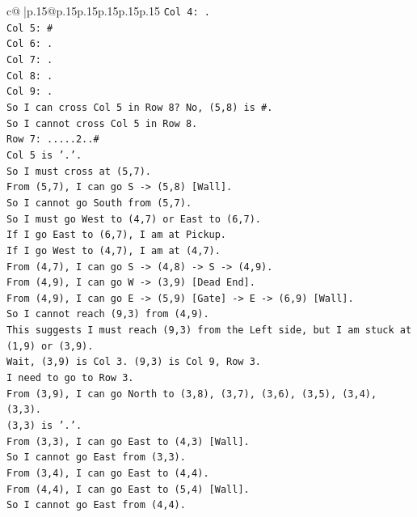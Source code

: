 \documentclass{article}
\begin{document}
{\begin{supertabular}{c@{$\;$}|p{.15\linewidth}@{}p{.15\linewidth}p{.15\linewidth}p{.15\linewidth}p{.15\linewidth}p{.15\linewidth}}
{{{\texttt{Col 4: .} \\
\texttt{Col 5: \#} \\
\texttt{Col 6: .} \\
\texttt{Col 7: .} \\
\texttt{Col 8: .} \\
\texttt{Col 9: .} \\
\texttt{So I can cross Col 5 in Row 8? No, (5,8) is \#.} \\
\texttt{So I cannot cross Col 5 in Row 8.} \\
\texttt{Row 7: .....2..\#} \\
\texttt{Col 5 is '.'.} \\
\texttt{So I must cross at (5,7).} \\
\texttt{From (5,7), I can go S {-}> (5,8) {[}Wall{]}.} \\
\texttt{So I cannot go South from (5,7).} \\
\texttt{So I must go West to (4,7) or East to (6,7).} \\
\texttt{If I go East to (6,7), I am at Pickup.} \\
\texttt{If I go West to (4,7), I am at (4,7).} \\
\texttt{From (4,7), I can go S {-}> (4,8) {-}> S {-}> (4,9).} \\
\texttt{From (4,9), I can go W {-}> (3,9) {[}Dead End{]}.} \\
\texttt{From (4,9), I can go E {-}> (5,9) {[}Gate{]} {-}> E {-}> (6,9) {[}Wall{]}.} \\
\texttt{So I cannot reach (9,3) from (4,9).} \\
\texttt{This suggests I must reach (9,3) from the Left side, but I am stuck at (1,9) or (3,9).} \\
\texttt{Wait, (3,9) is Col 3. (9,3) is Col 9, Row 3.} \\
\texttt{I need to go to Row 3.} \\
\texttt{From (3,9), I can go North to (3,8), (3,7), (3,6), (3,5), (3,4), (3,3).} \\
\texttt{(3,3) is '.'.} \\
\texttt{From (3,3), I can go East to (4,3) {[}Wall{]}.} \\
\texttt{So I cannot go East from (3,3).} \\
\texttt{From (3,4), I can go East to (4,4).} \\
\texttt{From (4,4), I can go East to (5,4) {[}Wall{]}.} \\
\texttt{So I cannot go East from (4,4).} \\
}}}
\end{supertabular}}
\end{document}
